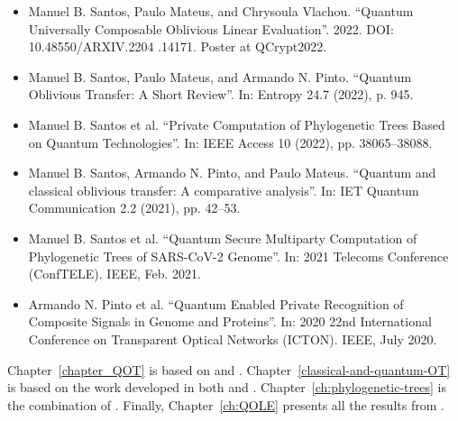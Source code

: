\begin{itemize}
	\item\cite{SMV22} Manuel B. Santos, Paulo Mateus, and Chrysoula Vlachou. “Quantum Universally
Composable Oblivious Linear Evaluation”. 2022. DOI: 10.48550/ARXIV.2204 .14171. Poster at QCrypt2022.	
	
	\item\cite{SMP22} Manuel B. Santos, Paulo Mateus, and Armando N. Pinto. “Quantum Oblivious Transfer:
A Short Review”. In: Entropy 24.7 (2022), p. 945.

	\item\cite{SGPM22} Manuel B. Santos et al. “Private Computation of Phylogenetic Trees Based on Quantum
Technologies”. In: IEEE Access 10 (2022), pp. 38065–38088.

	\item\cite{SPM21} Manuel B. Santos, Armando N. Pinto, and Paulo Mateus. “Quantum and classical
oblivious transfer: A comparative analysis”. In: IET Quantum Communication 2.2 (2021), pp. 42–53.

	\item\cite{SGPM21} Manuel B. Santos et al. “Quantum Secure Multiparty Computation of Phylogenetic Trees of SARS-CoV-2 Genome”. In: 2021 Telecoms Conference (ConfTELE). IEEE, Feb. 2021.

    \item\cite{POS+20} Armando N. Pinto et al. “Quantum Enabled Private Recognition of Composite Signals
in Genome and Proteins”. In: 2020 22nd International Conference on Transparent Optical
Networks (ICTON). IEEE, July 2020. 
\end{itemize}

Chapter~\ref{chapter_QOT} is based on \cite{SMP22} and \cite{SGPM22}. Chapter~\ref{classical-and-quantum-OT} is based on the work developed in both \cite{SPM21} and \cite{SGPM22}. Chapter~\ref{ch:phylogenetic-trees} is the combination of \cite{SGPM22, SGPM21, POS+20}. Finally, Chapter~\ref{ch:QOLE} presents all the results from \cite{SMV22}. 







